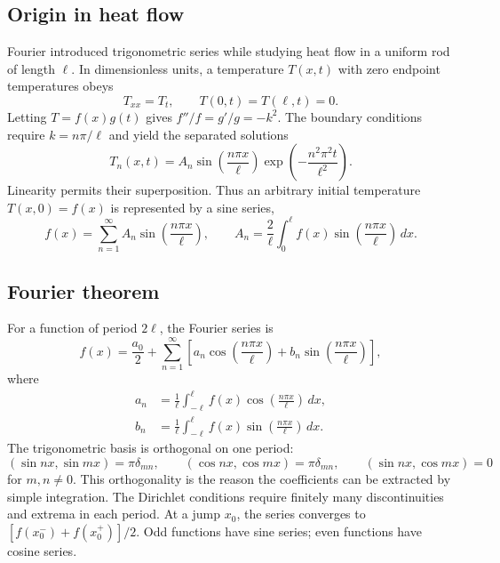\subsection{Origin in heat flow}

Fourier introduced trigonometric series while studying heat flow in a uniform rod of length $\ell$. In dimensionless units, a temperature $T(x,t)$ with zero endpoint temperatures obeys
\begin{equation}
T_{xx}=T_t,\qquad T(0,t)=T(\ell,t)=0.
\end{equation}
Letting $T=f(x)g(t)$ gives $f''/f=g'/g=-k^2$. The boundary conditions require $k=n\pi/\ell$ and yield the separated solutions
\begin{equation}
T_n(x,t)=A_n\sin\left(\frac{n\pi x}{\ell}\right)
\exp\left(-\frac{n^2\pi^2t}{\ell^2}\right).
\end{equation}
Linearity permits their superposition. Thus an arbitrary initial temperature $T(x,0)=f(x)$ is represented by a sine series,
\begin{equation}
f(x)=\sum_{n=1}^{\infty}A_n\sin\left(\frac{n\pi x}{\ell}\right),
\qquad
A_n=\frac{2}{\ell}\int_0^\ell f(x)\sin\left(\frac{n\pi x}{\ell}\right)\,dx.
\end{equation}

\subsection{Fourier theorem}

For a function of period $2\ell$, the Fourier series is
\begin{equation}
f(x)=\frac{a_0}{2}+\sum_{n=1}^{\infty}
\left[a_n\cos\left(\frac{n\pi x}{\ell}\right)+b_n\sin\left(\frac{n\pi x}{\ell}\right)\right],
\end{equation}
where
\begin{align}
a_n&=\frac{1}{\ell}\int_{-\ell}^{\ell}f(x)\cos\left(\frac{n\pi x}{\ell}\right)\,dx,\\
b_n&=\frac{1}{\ell}\int_{-\ell}^{\ell}f(x)\sin\left(\frac{n\pi x}{\ell}\right)\,dx.
\end{align}
The trigonometric basis is orthogonal on one period:
\begin{equation}
(\sin nx,\sin mx)=\pi\delta_{mn},\qquad
(\cos nx,\cos mx)=\pi\delta_{mn},\qquad
(\sin nx,\cos mx)=0
\end{equation}
for $m,n\neq0$. This orthogonality is the reason the coefficients can be extracted by simple integration. The Dirichlet conditions require finitely many discontinuities and extrema in each period. At a jump $x_0$, the series converges to $[f(x_0^-)+f(x_0^+)]/2$. Odd functions have sine series; even functions have cosine series.

